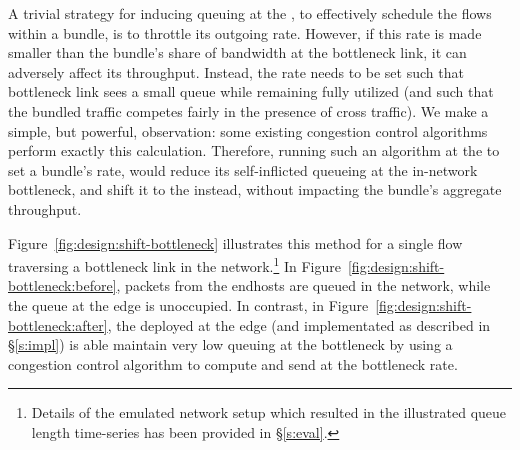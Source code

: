 
A trivial strategy for inducing queuing at the \name, to effectively schedule the flows within a bundle, is to throttle its outgoing rate. However, if this rate is made smaller than the bundle's share of bandwidth at the bottleneck link, it can adversely affect its throughput. Instead, the rate needs to be set such that bottleneck link sees a small queue while remaining fully utilized (and such that the bundled traffic competes fairly in the presence of cross traffic). We make a simple, but powerful, observation: some existing congestion control algorithms~\cite{nimbus, copa} perform exactly this calculation. Therefore, running such an algorithm at the \name to set a bundle's rate, would reduce its self-inflicted queueing at the in-network bottleneck, and shift it to the \name instead, without impacting the bundle's aggregate throughput. 

Figure~\ref{fig:design:shift-bottleneck} illustrates this method for a single flow traversing a bottleneck link in the network.\footnote{Details of the emulated network setup which resulted in the illustrated queue length time-series has been provided in \S\ref{s:eval}.} In Figure~\ref{fig:design:shift-bottleneck:before}, packets from the endhosts are queued in the network, while the queue at the edge is unoccupied. In contrast, in Figure~\ref{fig:design:shift-bottleneck:after}, the \name deployed at the edge (and implementated as described in \S\ref{s:impl}) is able maintain very low queuing at the bottleneck by using a congestion control algorithm to compute and send at the bottleneck rate.

